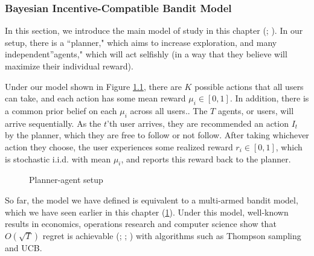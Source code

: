 \documentclass[
  letterpaper,
  numbers=noenddot,
  DIV=11]{scrreprt}
\theoremstyle{plain}
\theoremstyle{definition}
\theoremstyle{plain}
\theoremstyle{remark}
\begin{document}
\subsubsection*{Bayesian Incentive-Compatible Bandit
Model}\label{bayesian-incentive-compatible-bandit-model}

In this section, we introduce the main model of study in this chapter
(;
). In our setup, there is a ``planner," which aims to
increase exploration, and many independent''agents," which will act
selfishly (in a way that they believe will maximize their individual
reward).

Under our model shown in Figure \hyperref[fig-planner-agent]{1.1}, there
are \(K\) possible actions that all users can take, and each action has
some mean reward \(\mu_i \in [0, 1]\). In addition, there is a common
prior belief on each \(\mu_i\) across all users.. The \(T\) agents, or
users, will arrive sequentially. As the \(t\)'th user arrives, they are
recommended an action \(I_t\) by the planner, which they are free to
follow or not follow. After taking whichever action they choose, the
user experiences some realized reward \(r_i \in [0, 1]\), which is
stochastic i.i.d. with mean \(\mu_i\), and reports this reward back to
the planner.

\begin{figure}


\caption{\label{fig-planner-agent}Planner-agent setup}

\end{figure}%

So far, the model we have defined is equivalent to a multi-armed bandit
model, which we have seen earlier in this chapter
(\hyperref[4optim]{1}). Under this model, well-known results in
economics, operations research and computer science show that
\(O(\sqrt{T})\) regret is achievable
(; ; ) with algorithms such as Thompson sampling and UCB.
\end{document}
